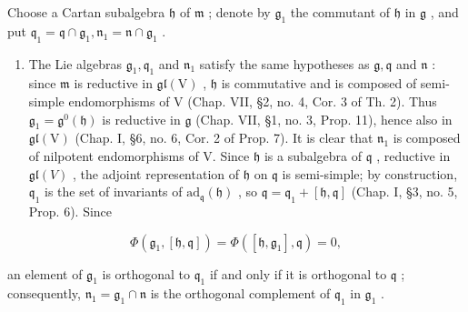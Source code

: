 Choose a Cartan subalgebra \(\mathfrak{h}\) of \(\mathfrak{m}\) ; denote by \(\mathfrak{g}_1\) the commutant of \(\mathfrak{h}\) in \(\mathfrak{g}\) , and put \(\mathfrak{q}_1 = \mathfrak{q} \cap \mathfrak{g}_1, \mathfrak{n}_1 = \mathfrak{n} \cap \mathfrak{g}_1\) .

\begin{enumerate}
\def\labelenumi{\alph{enumi})}
\setcounter{enumi}{2}
\tightlist
\item
  The Lie algebras \(\mathfrak{g}_1, \mathfrak{q}_1\) and \(\mathfrak{n}_1\) satisfy the same hypotheses as \(\mathfrak{g}, \mathfrak{q}\) and \(\mathfrak{n}\) : since \(\mathfrak{m}\) is reductive in \(\mathfrak{gl}(\mathrm{V})\) , \(\mathfrak{h}\) is commutative and is composed of semi-simple endomorphisms of V (Chap. VII, §2, no. 4, Cor. 3 of Th. 2). Thus \(\mathfrak{g}_1 = \mathfrak{g}^0(\mathfrak{h})\) is reductive in \(\mathfrak{g}\) (Chap. VII, §1, no. 3, Prop. 11), hence also in \(\mathfrak{gl}(\mathrm{V})\) (Chap. I, §6, no. 6, Cor. 2 of Prop. 7). It is clear that \(\mathfrak{n}_1\) is composed of nilpotent endomorphisms of V. Since \(\mathfrak{h}\) is a subalgebra of \(\mathfrak{q}\) , reductive in \(\mathfrak{gl}(V)\) , the adjoint representation of \(\mathfrak{h}\) on \(\mathfrak{q}\) is semi-simple; by construction, \(\mathfrak{q}_1\) is the set of invariants of \(\mathrm{ad}_{\mathfrak{q}}(\mathfrak{h})\) , so \(\mathfrak{q} = \mathfrak{q}_1 + [\mathfrak{h}, \mathfrak{q}]\) (Chap. I, §3, no. 5, Prop. 6). Since
\end{enumerate}

\[
\Phi (\mathfrak {g} _ {1}, [ \mathfrak {h}, \mathfrak {q} ]) = \Phi ([ \mathfrak {h}, \mathfrak {g} _ {1} ], \mathfrak {q}) = 0,
\]

an element of \(\mathfrak{g}_1\) is orthogonal to \(\mathfrak{q}_1\) if and only if it is orthogonal to \(\mathfrak{q}\) ; consequently, \(\mathfrak{n}_1 = \mathfrak{g}_1 \cap \mathfrak{n}\) is the orthogonal complement of \(\mathfrak{q}_1\) in \(\mathfrak{g}_1\) .

